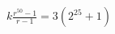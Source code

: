 \documentclass[preview]{standalone}
\begin{document}
\begin{align*}
k \frac{r^{50} - 1}{r - 1} = 3(2^{25} + 1)
\end{align*}
\end{document}
